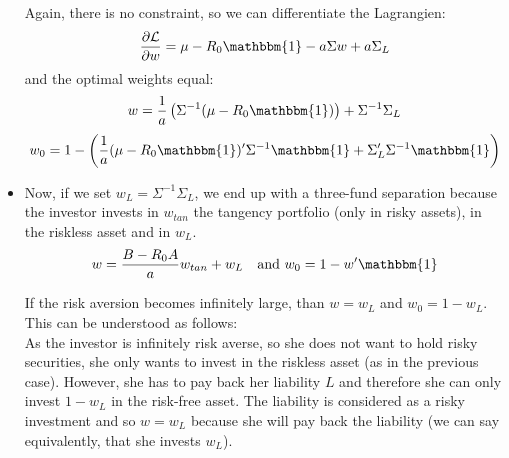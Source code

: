 \documentclass[10pt]{article}
\newenvironment{exercise}[2][Exercise]{\begin{trivlist}
  \item[\hskip \labelsep {\bfseries #1}\hskip \labelsep {\bfseries #2.}]}{\end{trivlist}}
\begin{document}
\begin{exercise}{1}
\begin{itemize}
    Again, there is no constraint, so we can differentiate the Lagrangien: 
    $$ \frac{\partial \mathcal{L}}{\partial w} = \mu -R_0\mathbbm{1} - a\Sigma w + a\Sigma_L$$ and the optimal weights equal:
    $$ w = \frac{1}{a}\left(\Sigma^{-1}(\mu-R_0\mathbbm{1})\right) + \Sigma^{-1}\Sigma_L $$
    $$ w_0 = 1 - \left(\frac{1}{a}(\mu-R_0\mathbbm{1})'\Sigma^{-1}\mathbbm{1} + \Sigma_L'\Sigma^{-1}\mathbbm{1}\right)$$

    \item Now, if we set $w_L = \Sigma^{-1}\Sigma_L$, we end up with a three-fund separation because the investor invests in $w_{tan}$ the tangency portfolio (only in risky assets), in the riskless asset and in $w_L$. 
    $$ w = \frac{B-R_0A}{a}w_{tan} + w_L \quad \text{and } w_0 = 1 - w'\mathbbm{1}$$

    If the risk aversion becomes infinitely large, than $w = w_L$ and $w_0 = 1 - w_L$. This can be understood as follows: 
    \\
    As the investor is infinitely risk averse, so she does not want to hold risky securities, she only wants to invest in the riskless asset (as in the previous case). However, she has to pay back her liability $L$ and therefore she can only invest $1 - w_L$ in the risk-free asset. The liability is considered as a risky investment and so $w = w_L$ because she will pay back the liability (we can say equivalently, that she invests $w_L$). 
  \end{itemize}
\end{exercise}
\end{document}
